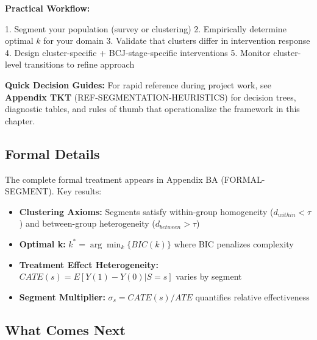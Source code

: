 \begin{tcolorbox}[colback=green!10!white, colframe=green!75!black,
    title=\textbf{Chapter 14: Summary}]
\begin{enumerate}
\end{enumerate}

\textbf{Practical Workflow:}
\begin{itemize}[nosep]
    1. Segment your population (survey or clustering)
    2. Empirically determine optimal $k$ for your domain
    3. Validate that clusters differ in intervention response
    4. Design cluster-specific + BCJ-stage-specific interventions
    5. Monitor cluster-level transitions to refine approach
\end{itemize}

\vspace{0.5em}

\textbf{Quick Decision Guides:} For rapid reference during project work, see \textbf{Appendix TKT} (REF-SEGMENTATION-HEURISTICS) for decision trees, diagnostic tables, and rules of thumb that operationalize the framework in this chapter.

\end{tcolorbox}

\subsection{Formal Details}
\label{sec:ch14-formal}

The complete formal treatment appears in Appendix BA (FORMAL-SEGMENT). Key results:

\begin{itemize}[nosep]
    \item \textbf{Clustering Axioms:} Segments satisfy within-group homogeneity ($d_{within} < \tau$) and between-group heterogeneity ($d_{between} > \tau$)
    \item \textbf{Optimal k:} $k^* = \arg\min_k \{ BIC(k) \}$ where BIC penalizes complexity
    \item \textbf{Treatment Effect Heterogeneity:} $CATE(s) = E[Y(1) - Y(0) | S = s]$ varies by segment
    \item \textbf{Segment Multiplier:} $\sigma_s = CATE(s) / ATE$ quantifies relative effectiveness
\end{itemize}

\subsection{What Comes Next}
\label{sec:ch14-next}

